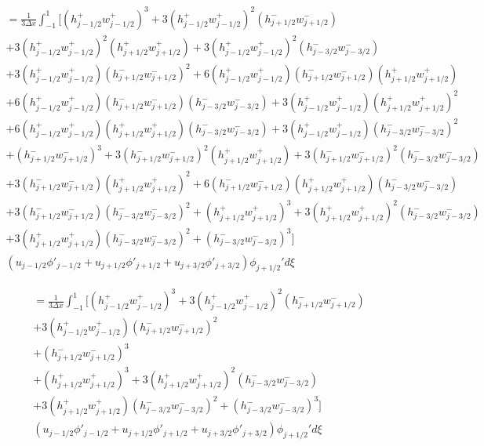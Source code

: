 \documentclass[12pt]{article}
\begin{document}
\begin{multline}
= \frac{1}{3\Delta x} \int_{-1}^{1} \bigg[ \left(h^+_{j- 1/2}w^+_{j - 1/2}\right)^3 + 3 \left(h^+_{j- 1/2}w^+_{j - 1/2}\right)^2\left(h^-_{j+ 1/2}w^-_{j + 1/2}\right) \\+ 3\left(h^+_{j- 1/2}w^+_{j - 1/2}\right)^2\left(h^+_{j+ 1/2}w^+_{j + 1/2}\right)  +3\left(h^+_{j- 1/2}w^+_{j - 1/2}\right)^2\left(h^-_{j- 3/2}w^-_{j - 3/2}\right) \\ + 3\left(h^+_{j- 1/2}w^+_{j - 1/2}\right)\left(h^-_{j+ 1/2}w^-_{j + 1/2}\right)^2 + 6\left(h^+_{j- 1/2}w^+_{j - 1/2}\right)\left(h^-_{j+ 1/2}w^-_{j + 1/2}\right)\left(h^+_{j+ 1/2}w^+_{j + 1/2}\right) \\ + 6\left(h^+_{j- 1/2}w^+_{j - 1/2}\right)\left(h^-_{j+ 1/2}w^-_{j + 1/2}\right)\left(h^-_{j- 3/2}w^-_{j - 3/2}\right) + 3\left(h^+_{j- 1/2}w^+_{j - 1/2}\right)\left(h^+_{j+ 1/2}w^+_{j + 1/2}\right)^2  \\+ 6\left(h^+_{j- 1/2}w^+_{j - 1/2}\right)\left(h^+_{j+ 1/2}w^+_{j + 1/2}\right)\left(h^-_{j- 3/2}w^-_{j - 3/2}\right) + 3\left(h^+_{j- 1/2}w^+_{j - 1/2}\right)\left(h^-_{j- 3/2}w^-_{j - 3/2}\right)^2 \\ +\left(h^-_{j+ 1/2}w^-_{j + 1/2}\right)^3 + 3\left(h^-_{j+ 1/2}w^-_{j + 1/2}\right)^2 \left(h^+_{j+ 1/2}w^+_{j + 1/2}\right) +3\left(h^-_{j+ 1/2}w^-_{j + 1/2}\right)^2\left(h^-_{j- 3/2}w^-_{j - 3/2}\right) \\ + 3\left(h^-_{j+ 1/2}w^-_{j + 1/2}\right)\left(h^+_{j+ 1/2}w^+_{j + 1/2}\right)^2 + 6\left(h^-_{j+ 1/2}w^-_{j + 1/2}\right)\left(h^+_{j+ 1/2}w^+_{j + 1/2}\right)\left(h^-_{j- 3/2}w^-_{j - 3/2}\right) \\ + 3\left(h^-_{j+ 1/2}w^-_{j + 1/2}\right)\left(h^-_{j- 3/2}w^-_{j - 3/2}\right)^2 + \left(h^+_{j+ 1/2}w^+_{j + 1/2}\right)^3 + 3\left(h^+_{j+ 1/2}w^+_{j + 1/2}\right)^2\left(h^-_{j- 3/2}w^-_{j - 3/2}\right) \\ + 3\left(h^+_{j+ 1/2}w^+_{j + 1/2}\right) \left(h^-_{j- 3/2}w^-_{j - 3/2}\right)^2 + \left(h^-_{j- 3/2}w^-_{j - 3/2}\right)^3  \bigg] \\ \left(u_{j- 1/2}\phi'_{j - 1/2} + u_{j+1/2}\phi'_{j+1/2} +u_{j+ 3/2}\phi'_{j+ 3/2} \right)\phi_{j+1/2}'d\xi
\end{multline}

\begin{multline}
= \frac{1}{3\Delta x} \int_{-1}^{1} \bigg[ \left(h^+_{j- 1/2}w^+_{j - 1/2}\right)^3 + 3 \left(h^+_{j- 1/2}w^+_{j - 1/2}\right)^2\left(h^-_{j+ 1/2}w^-_{j + 1/2}\right) \\ + 3\left(h^+_{j- 1/2}w^+_{j - 1/2}\right)\left(h^-_{j+ 1/2}w^-_{j + 1/2}\right)^2 \\ +\left(h^-_{j+ 1/2}w^-_{j + 1/2}\right)^3  \\ + \left(h^+_{j+ 1/2}w^+_{j + 1/2}\right)^3 + 3\left(h^+_{j+ 1/2}w^+_{j + 1/2}\right)^2\left(h^-_{j- 3/2}w^-_{j - 3/2}\right) \\ + 3\left(h^+_{j+ 1/2}w^+_{j + 1/2}\right) \left(h^-_{j- 3/2}w^-_{j - 3/2}\right)^2 + \left(h^-_{j- 3/2}w^-_{j - 3/2}\right)^3  \bigg] \\ \left(u_{j- 1/2}\phi'_{j - 1/2} + u_{j+1/2}\phi'_{j+1/2} +u_{j+ 3/2}\phi'_{j+ 3/2} \right)\phi_{j+1/2}'d\xi
\end{multline}
\end{document}
